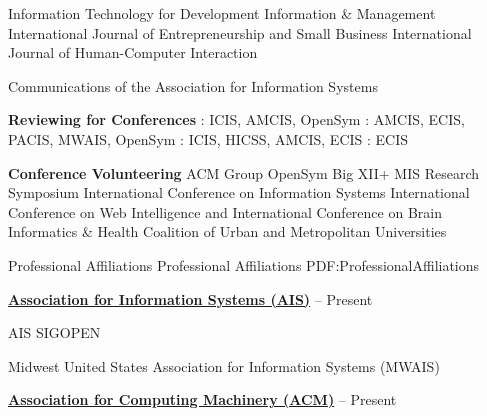 \documentclass[letterpaper,MMMyyyy,nonstopmode]{simpleresumecv}
\begin{document}
\begin{Body}
\hfill
{}
\begin{Detail}
\SubBulletItem
Information Technology for Development
\SubBulletItem
Information \& Management
\SubBulletItem
International Journal of Entrepreneurship and Small Business
\SubBulletItem
International Journal of Human-Computer Interaction 
\end{Detail}

\hfill
{}
\begin{Detail}
\SubBulletItem
Communications of the Association for Information Systems 
\end{Detail}


\BigGap
\Entry
\textbf{Reviewing for Conferences}
: ICIS, AMCIS, OpenSym
\hfill
{}
: AMCIS, ECIS, PACIS, MWAIS, OpenSym
\hfill
{}
: ICIS, HICSS, AMCIS, ECIS
\hfill
{}
: ECIS
\hfill
{}


\BigGap
\Entry
\textbf{Conference Volunteering}
\BulletItem
ACM Group
\hfill
{}
\BulletItem
OpenSym
\hfill
{}
\BulletItem
Big XII+ MIS Research Symposium
\hfill
{}
\BulletItem
International Conference on Information Systems
\hfill
{}
\BulletItem
International Conference on Web Intelligence\newline
and International Conference on Brain Informatics \& Health
\hfill
{}
\BulletItem
Coalition of Urban and Metropolitan Universities
\hfill
{}


\Section
{Professional Affiliations}%
{Professional Affiliations}%
{PDF:ProfessionalAffiliations}

\Entry
\href{http://aisnet.org/default.asp?}
{\textbf{Association for Information Systems (AIS)}}
\hfill
{} --
Present

\BulletItem
AIS SIGOPEN

\BulletItem
Midwest United States Association for Information Systems (MWAIS)

\BigGap
\Entry
\href{https://www.acm.org/}
{\textbf{Association for Computing Machinery (ACM)}}
\hfill
{} --
Present






\end{Body}
\end{document}
